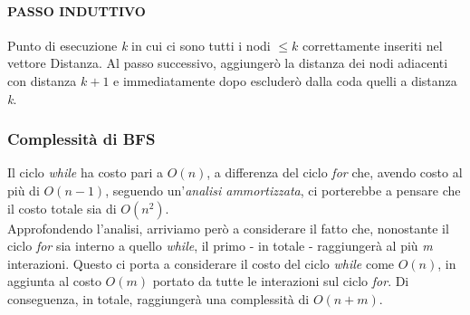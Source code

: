 \paragraph{PASSO INDUTTIVO}
Punto di esecuzione \textit{k} in cui ci sono tutti i nodi $\leq k$ correttamente inseriti nel vettore Distanza. Al passo successivo, aggiungerò la distanza dei nodi adiacenti con distanza $k+1$ e immediatamente dopo escluderò dalla coda quelli a distanza \textit{k}.
\subsubsection{Complessità di BFS}
Il ciclo \textit{while} ha costo pari a $O(n)$, a differenza del ciclo \textit{for} che, avendo costo al più di $O(n-1)$, seguendo un'\textit{analisi ammortizzata}, ci porterebbe a pensare che il costo totale sia di $O(n^2)$. \\
Approfondendo l'analisi, arriviamo però a considerare il fatto che, nonostante il ciclo \textit{for} sia interno a quello \textit{while}, il primo - in totale - raggiungerà al più \textit{m} interazioni. Questo ci porta a considerare il costo del ciclo \textit{while} come $O(n)$, in aggiunta al costo $O(m)$ portato da tutte le interazioni sul ciclo \textit{for}. Di conseguenza, in totale, raggiungerà una complessità di $O(n+m)$.

